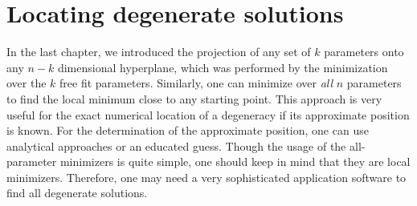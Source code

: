 \chapter{Locating degenerate solutions}

In the last chapter, we introduced the projection of any set of $k$ parameters onto any $n-k$ dimensional hyperplane, which was performed by the minimization over the $k$ free fit parameters. Similarly, one can minimize over {\em all} $n$ parameters to find the local minimum close to any starting point. This approach is very useful for the exact numerical location of a degeneracy if its approximate position is known. For the determination of the approximate position, one can use analytical approaches or an educated guess. 
Though the usage of the all-parameter minimizers is quite simple, one should keep in mind that they are local minimizers. Therefore, one may need a very sophisticated application software to find all degenerate solutions.

